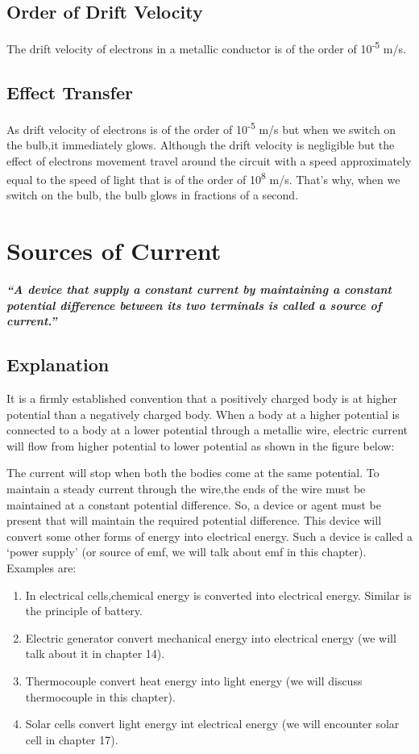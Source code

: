 \subsection*{Order of Drift Velocity}
The drift velocity of electrons in a metallic conductor is of the order of 10\textsuperscript{-5} m/s.
\subsection*{Effect Transfer}
As drift velocity of electrons is of the order of 10\textsuperscript{-5} m/s but when we switch on the bulb,it immediately glows. Although the drift velocity is negligible but the effect of electrons movement travel around the circuit with a speed approximately equal to the speed of light that is of the order of 10\textsuperscript{8} m/s. That’s why, when we switch on the bulb, the bulb glows in fractions of a second.
\section{Sources of Current}
\textit{\textbf{``A device that supply a constant current by maintaining a constant potential difference between its two terminals is called a source of current.”}}
\subsection*{Explanation}
It is a firmly established convention that a positively charged body is at higher potential than a negatively charged body. When a body at a higher potential is connected to a body at a lower potential through a metallic wire, electric current will flow from higher potential to lower potential as shown in the figure below:


The current will stop when both the bodies come at the same potential. To maintain a steady current through the wire,the ends of the wire must be maintained at a constant potential difference. So, a device or agent must be present that will maintain the required potential difference. This device will convert some other forms of energy into electrical energy. Such a device is called a ‘power supply’ (or source of emf, we will talk about emf in this chapter). Examples are:
\begin{enumerate}[label=(\roman*)] 
    \item In electrical cells,chemical energy is converted into electrical energy.
    Similar is the principle of battery.
    \item Electric generator convert mechanical energy
    into electrical energy (we will talk about it in chapter 14).
    \item Thermocouple convert heat energy into light energy
    (we will discuss thermocouple in this chapter).
    \item Solar cells convert light energy int electrical
    energy (we will encounter solar cell in chapter 17).
\end{enumerate}

